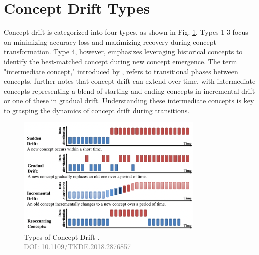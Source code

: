 \section{Concept Drift Types}
\label{sec:background_concept_drift_types}
Concept drift is categorized into four types, as shown in Fig. \ref{fig:concept-drift-types}. Types 1-3 focus on minimizing accuracy loss and maximizing recovery during concept transformation. Type 4, however, emphasizes leveraging historical concepts to identify the best-matched concept during new concept emergence. The term "intermediate concept," introduced by \cite{losing2016knn}, refers to transitional phases between concepts. \cite{liu2018making} further notes that concept drift can extend over time, with intermediate concepts representing a blend of starting and ending concepts in incremental drift or one of these in gradual drift. Understanding these intermediate concepts is key to grasping the dynamics of concept drift during transitions.
 
\begin{figure}[!ht]
    \centering
    \includegraphics[width=0.8\textwidth]{2_Background/figures/concept_drift_types.png}
    \caption{Types of Concept Drift \cite{8496795}. \\ \textcolor{gray}{\fontsize{10}{0}\selectfont DOI: 10.1109/TKDE.2018.2876857}}
    \label{fig:concept-drift-types}
\end{figure}

